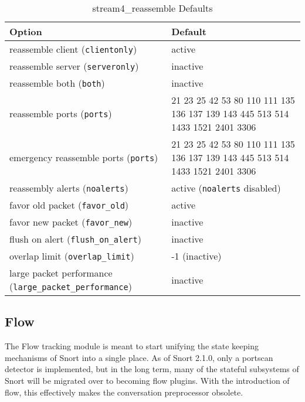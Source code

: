 \documentclass[english]{report}
\begin{document}
%
\begin{table}[!hbpt]

\caption{stream4\_reassemble Defaults\label{stream4 reassemble defaults}}

\begin{center}\begin{tabular}{| l | p{3in} |}
\hline 
\textbf{Option} &
\textbf{Default}\\
\hline
\hline 
reassemble client (\texttt{clientonly}) & active\\
\hline 
reassemble server (\texttt{serveronly}) & inactive\\
\hline 
reassemble both (\texttt{both}) & inactive\\
\hline
reassemble ports (\texttt{ports}) & 21 23 25 42 53 80 110 111 135 136 137 139 143 445 513 514 1433 1521 2401 3306\\
\hline
emergency reassemble ports (\texttt{ports}) & 21 23 25 42 53 80 110 111 135 136 137 139 143 445 513 514 1433 1521 2401 3306\\
\hline 
reassembly alerts (\texttt{noalerts}) & active (\texttt{noalerts} disabled)\\
\hline
favor old packet (\texttt{favor\_old}) & active\\
\hline
favor new packet (\texttt{favor\_new}) & inactive\\
\hline
flush on alert (\texttt{flush\_on\_alert}) & inactive\\
\hline
overlap limit (\texttt{overlap\_limit}) & -1 (inactive)\\
\hline
large packet performance (\texttt{large\_packet\_performance}) & inactive\\
\hline
\end{tabular}
\end{center}
\end{table}

\clearpage

\subsection{Flow\label{sub:flow}}

The Flow tracking module is meant to start unifying the state keeping
mechanisms of Snort into a single place. As of Snort 2.1.0, only a portscan
detector is implemented, but in the long term,  many of the stateful subsystems
of Snort will be migrated over to becoming flow plugins. With the introduction
of flow, this effectively makes the conversation preprocessor obsolete.
\end{document}
